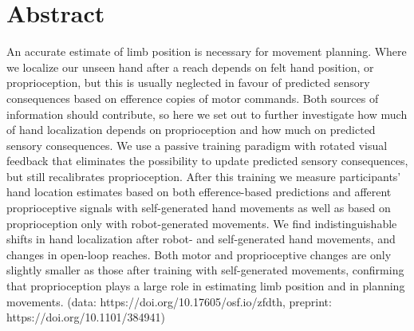 \documentclass[10pt,letterpaper]{article}
\date{}
\newcommand{\getIndex}[2]{
  \ForEach{,}{\IfEq{#1}{\thislevelitem}{\number\thislevelcount\ExitForEach}{}}{#2}
}
\newcommand{\getAff}[1]{
  \getIndex{#1}{YORK,MANSOURA}
}
\begin{document}
\vspace*{0.2in}

\section*{Abstract}
An accurate estimate of limb position is necessary for movement
planning. Where we localize our unseen hand after a reach depends on
felt hand position, or proprioception, but this is usually neglected in
favour of predicted sensory consequences based on efference copies of
motor commands. Both sources of information should contribute, so here
we set out to further investigate how much of hand localization depends
on proprioception and how much on predicted sensory consequences. We use
a passive training paradigm with rotated visual feedback that eliminates
the possibility to update predicted sensory consequences, but still
recalibrates proprioception. After this training we measure
participants' hand location estimates based on both efference-based
predictions and afferent proprioceptive signals with self-generated hand
movements as well as based on proprioception only with robot-generated
movements. We find indistinguishable shifts in hand localization after
robot- and self-generated hand movements, and changes in open-loop
reaches. Both motor and proprioceptive changes are only slightly smaller
as those after training with self-generated movements, confirming that
proprioception plays a large role in estimating limb position and in
planning movements. (data: https://doi.org/10.17605/osf.io/zfdth,
preprint: https://doi.org/10.1101/384941)
\end{document}
